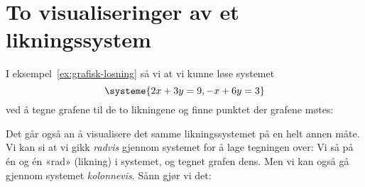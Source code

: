 

\label{ch:vektorer}


\section*{To visualiseringer av et likningssystem}

I eksempel~\ref{ex:grafisk-losning} så vi at vi kunne løse systemet
\[
\systeme{
2x + 3y = 9,
-x + 6y = 3
}
\]
ved å tegne grafene til de to likningene og finne punktet der grafene
møtes:
\begin{center}
\end{center}

Det går også an å visualisere det samme likningssystemet på en helt
annen måte.  Vi kan si at vi gikk \emph{radvis} gjennom systemet for å
lage tegningen over: Vi så på én og én «rad» (likning) i systemet, og
tegnet grafen dens.  Men vi kan også gå gjennom systemet
\emph{kolonnevis}.  Sånn gjør vi det:


